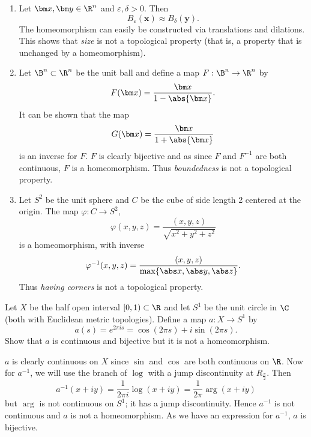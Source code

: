 \begin{example}[]
	\hfill
	\begin{enumerate}
		\item 
			Let $\bm x, \bm y \in \R^n$ and $\varepsilon, \delta > 0$. 
			Then \[
				B_{\varepsilon}(\bm x) \approx B_{\delta}(\bm y).
			\]
			The homeomorphism can easily be constructed via translations and
			dilations.
			This shows that \emph{size} is not a topological property
			(that is, a property that is unchanged by a homeomorphism).

		\item 
			Let $\B^n \subset \R^n$ be the unit ball and define a map
			$F: \B^n \to \R^n$ by
			\[
				F(\bm x) = \frac{\bm x}{1 - \abs{\bm x}}.
			\]
			It can be shown that the map
			\[
				G(\bm x) = \frac{\bm x}{1 + \abs{\bm x}} 
			\]
			is an inverse for $F$.
			$F$ is clearly bijective and as since $F$ and $F^{-1}$
			are both continuous, $F$ is a homeomorphism.
			Thus \emph{boundedness} is not a topological property.

		\item 
			Let $S^2$ be the unit sphere and $C$ be the cube of side length 2
			centered at the origin.
			The map $\varphi: C \to S^2$,
			\[
				\varphi(x,y,z) = \frac{(x,y,z)}{\sqrt{x^2+y^2+z^2}} 
			\]
			is a homeomorphism, with inverse
			\[
				\varphi^{-1}(x,y,z) = 
				\frac{(x,y,z)}{\max\{\abs x, \abs y, \abs z\}}.
			\]
			Thus \emph{having corners} is not a topological property.
	\end{enumerate}
\end{example}

\begin{problem}
	\label{prob:local-homeo-ex}
	Let $X$ be the half open interval $[0,1) \subset \R$ and 
	let $S^1$ be the unit circle in $\C$ 
	(both with Euclidean metric topologies).
	Define a map $a: X \to S^1$ by
	\[
		a(s) = e^{2\pi is} = \cos(2\pi s) + i \sin(2\pi s).
	\]
	Show that $a$ is continuous and bijective but it is not a homeomorphism.
\end{problem}

\begin{solution}
	$a$ is clearly continuous on $X$ since $\sin$ and $\cos$ are both continuous
	on $\R$.
	Now for $a^{-1}$, we will use the branch of $\log$ with a jump discontinuity
	at $R_{\frac{\pi}2}$.
	Then
	\[
		a^{-1}(x + iy) 
		= \frac1{2\pi i} \log(x+iy)
		= \frac1{2\pi}\arg(x+iy)
	\]
	but $\arg$ is not continuous on $S^1$;
	it has a jump discontinuity. 
	Hence $a^{-1}$ is not continuous and
	$a$ is not a homeomorphism.
	As we have an expression for $a^{-1}$, $a$ is bijective.
\end{solution}

